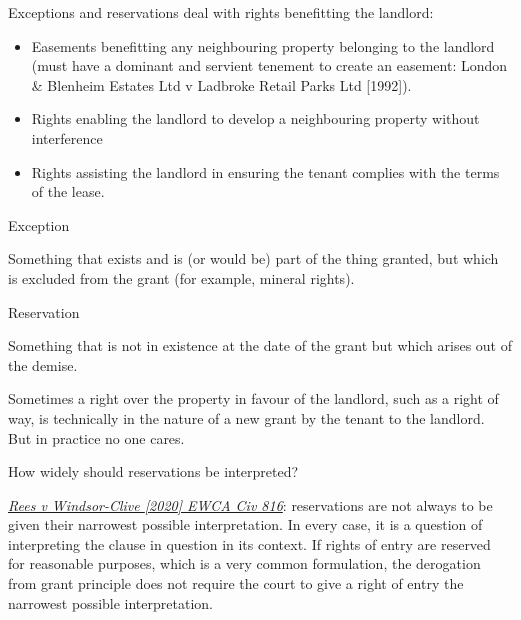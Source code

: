 \documentclass[
]{article}
\providecommand{\tightlist}{%
  \setlength{\itemsep}{0pt}\setlength{\parskip}{0pt}}
\newenvironment{env-ab392b14-a05f-4d9a-80eb-a63d00eb59ea}
{
    \savenotes\tcolorbox[blanker,breakable,left=5pt,borderline west={2pt}{-4pt}{gold}]
}
{
    \endtcolorbox\spewnotes
}
\newenvironment{env-fdd3b853-72b2-4779-a214-b5da0ccdb5e7}
{
    \savenotes\tcolorbox[blanker,breakable,left=5pt,borderline west={2pt}{-4pt}{gray}]
}
{
    \endtcolorbox\spewnotes
}
\begin{document}
Exceptions and reservations deal with rights benefitting the landlord:

\begin{itemize}
\tightlist
\item
  Easements benefitting any neighbouring property belonging to the
  landlord (must have a dominant and servient tenement to create an
  easement: London \& Blenheim Estates Ltd v Ladbroke Retail Parks Ltd
  {[}1992{]}).
\item
  Rights enabling the landlord to develop a neighbouring property
  without interference
\item
  Rights assisting the landlord in ensuring the tenant complies with the
  terms of the lease.
\end{itemize}

\begin{env-ab392b14-a05f-4d9a-80eb-a63d00eb59ea}

Exception

Something that exists and is (or would be) part of the thing granted,
but which is excluded from the grant (for example, mineral rights).

\end{env-ab392b14-a05f-4d9a-80eb-a63d00eb59ea}

\begin{env-ab392b14-a05f-4d9a-80eb-a63d00eb59ea}

Reservation

Something that is not in existence at the date of the grant but which
arises out of the demise.

\end{env-ab392b14-a05f-4d9a-80eb-a63d00eb59ea}

Sometimes a right over the property in favour of the landlord, such as a
right of way, is technically in the nature of a new grant by the tenant
to the landlord. But in practice no one cares.

\begin{env-fdd3b853-72b2-4779-a214-b5da0ccdb5e7}

How widely should reservations be interpreted?

\emph{\href{https://uk.westlaw.com/D-105-0126?originationContext=document\&transitionType=PLDocumentLink\&contextData=(sc.Default)\&ppcid=8480f1faa9a046d89d64dd6a4fb84a19}{Rees
v Windsor-Clive {[}2020{]} EWCA Civ 816}}: reservations are not always
to be given their narrowest possible interpretation. In every case, it
is a question of interpreting the clause in question in its context. If
rights of entry are reserved for reasonable purposes, which is a very
common formulation, the derogation from grant principle does not require
the court to give a right of entry the narrowest possible
interpretation.

\end{env-fdd3b853-72b2-4779-a214-b5da0ccdb5e7}
\end{document}
